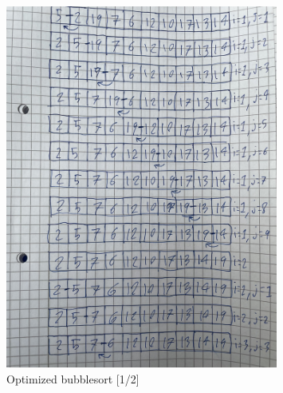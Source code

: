 \documentclass[a4paper,12pt]{article}
\begin{document}
\begin{figure}[H] 
    \centering
    \includegraphics[width=0.8\textwidth]{IMG_2074.jpg}
    \caption{Optimized bubblesort [1/2]}
\end{figure}
\end{document}
